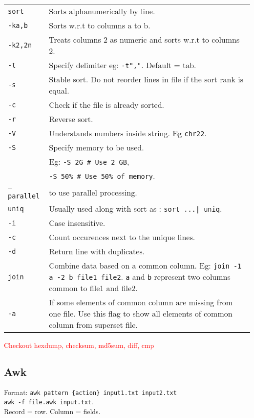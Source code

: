 \begin{tabularx}{\linewidth}{lX}
    \texttt{sort} & Sorts alphanumerically by line.\\
    \texttt{-ka,b} & Sorts w.r.t to columns a to b.\\
    \texttt{-k2,2n} & Treats columns 2 as numeric and sorts w.r.t to columns 2.\\
    \texttt{-t} & Specify delimiter eg: \texttt{-t","}. Default = tab.\\
    \texttt{-s} & Stable sort. Do not reorder lines in file if the sort rank is equal.\\
    \texttt{-c} & Check if the file is already sorted. \\
    \texttt{-r} & Reverse sort.\\
    \texttt{-V} & Understands numbers inside string. Eg \texttt{chr22}.\\
    \texttt{-S} & Specify memory to be used. \\
    & Eg: \texttt{-S 2G \# Use 2 GB}, \\ 
    & \hspace{13pt} \texttt{-S 50\% \# Use 50\% of memory}. \\
    \texttt{--parallel} & to use parallel processing.\\
    \hline
    \texttt{uniq} & Usually used along with sort as : \texttt{sort ...| uniq}.\\
    \texttt{-i} & Case insensitive.\\
    \texttt{-c} & Count occurences next to the unique lines.\\
    \texttt{-d} & Return line with duplicates.\\
    \hline
    \texttt{join} & Combine data based on a common column. Eg: \texttt{join -1 a -2 b file1 file2}. \texttt{a} and \texttt{b} represent two columns common to file1 and file2. \\
    \texttt{-a} & If some elements of common column are missing from one file. Use this flag to show all elements of common column from superset file. \\
    \hline
\end{tabularx}

\textcolor{red}{Checkout hexdump, checksum, md5sum, diff, cmp}

\subsection{Awk}

Format: \texttt{awk pattern \{action\} input1.txt input2.txt} \\ \texttt{awk -f file.awk input.txt}.\\ Record = row. Column = fields. \\

